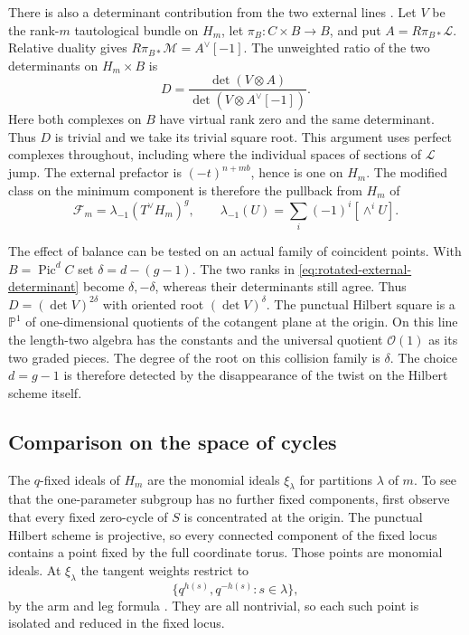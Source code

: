 There is also a determinant contribution from the two external lines
\cite{no}. Let \(V\) be the rank-\(m\) tautological bundle on \(H_m\),
let \(\pi_B:C\times B\to B\), and put \(A=R\pi_{B*}\mathcal L\).
Relative duality gives \(R\pi_{B*}\mathcal M=A^\vee[-1]\).
The unweighted ratio of the two determinants on \(H_m\times B\) is
\begin{equation}
 D=\frac{\det(V\otimes A)}{\det(V\otimes A^\vee[-1])}.
 \label{eq:rotated-external-determinant}
\end{equation}
Here both complexes on \(B\) have virtual rank zero and the same
determinant. Thus \(D\) is trivial and we take its trivial square root.
This argument uses perfect complexes throughout, including where the
individual spaces of sections of \(\mathcal L\) jump. The external
prefactor is \((-t)^{n+mb}\), hence is one on \(H_m\). The modified
class on the minimum component is therefore the pullback from \(H_m\)
of
\begin{equation}
 \mathcal F_m=\lambda_{-1}(T^\vee H_m)^g,\qquad
 \lambda_{-1}(U)=\sum_i(-1)^i[\wedge^i U].
 \label{eq:rotated-exterior}
\end{equation}

The effect of balance can be tested on an actual family of coincident
points. With \(B=\operatorname{Pic}^d C\) set \(\delta=d-(g-1)\).
The two ranks in \eqref{eq:rotated-external-determinant} become
\(\delta,-\delta\), whereas their determinants still agree. Thus
\(D=(\det V)^{2\delta}\) with oriented root \((\det V)^\delta\).
The punctual Hilbert square is a \(\mathbb P^1\) of one-dimensional
quotients of the cotangent plane at the origin. On this line the
length-two algebra has the constants and the universal quotient
\(\mathcal O(1)\) as its two graded pieces. The degree of the root on
this collision family is \(\delta\). The choice \(d=g-1\) is therefore
detected by the disappearance of the twist on the Hilbert scheme
itself.

\subsection{Comparison on the space of cycles}

The \(q\)-fixed ideals of \(H_m\) are the monomial ideals
\(\xi_\lambda\) for partitions \(\lambda\) of \(m\). To see that the
one-parameter subgroup has no further fixed components, first observe
that every fixed zero-cycle of \(S\) is concentrated at the origin.
The punctual Hilbert scheme is projective, so every connected component
of the fixed locus contains a point fixed by the full coordinate torus.
Those points are monomial ideals. At \(\xi_\lambda\) the tangent weights
restrict to
\begin{equation}
 \big\{q^{h(s)},q^{-h(s)}:s\in\lambda\big\},
 \label{eq:rotated-hook-weights}
\end{equation}
by the arm and leg formula \cite[Lemma~5.4.5]{haiman}. They are all nontrivial, so
each such point is isolated and reduced in the fixed locus.

